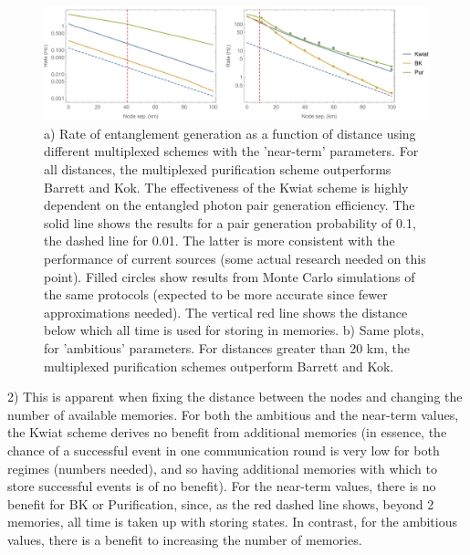 \documentclass[aps,pra,superscriptaddress,preprint]{revtex4-1}
\begin{document}
\begin{figure}[htbp]
\begin{center}
\includegraphics[width=16.0cm]{AmbAndNearValuesRateVsDistance.pdf}
\caption{a) Rate of entanglement generation as a function of distance using different multiplexed schemes with the 'near-term' parameters. For all distances, the multiplexed purification scheme outperforms Barrett and Kok. The effectiveness of the Kwiat scheme is highly dependent on the entangled photon pair generation efficiency. The solid line shows the results for a pair generation probability of 0.1, the dashed line for 0.01. The latter is more consistent with the performance of current sources (some actual research needed on this point). Filled circles show results from Monte Carlo simulations of the same protocols (expected to be more accurate since fewer approximations needed). The vertical red line shows the distance below which all time is used for storing in memories. b) Same plots, for 'ambitious' parameters. For distances greater than 20 km, the multiplexed purification schemes outperform Barrett and Kok.}
\label{fig:AmbAndNearValuesRateVsDistance}
\end{center}
\end{figure}

2) This is apparent when fixing the distance between the nodes and changing the number of available memories. For both the ambitious and the near-term values, the Kwiat scheme derives no benefit from additional memories (in essence, the chance of a successful event in one communication round is very low for both regimes (numbers needed), and so having additional memories with which to store successful events is of no benefit). For the near-term values, there is no benefit for BK or Purification, since, as the red dashed line shows, beyond 2 memories, all time is taken up with storing states. In contrast, for the ambitious values, there is a benefit to increasing the number of memories.
\end{document}
